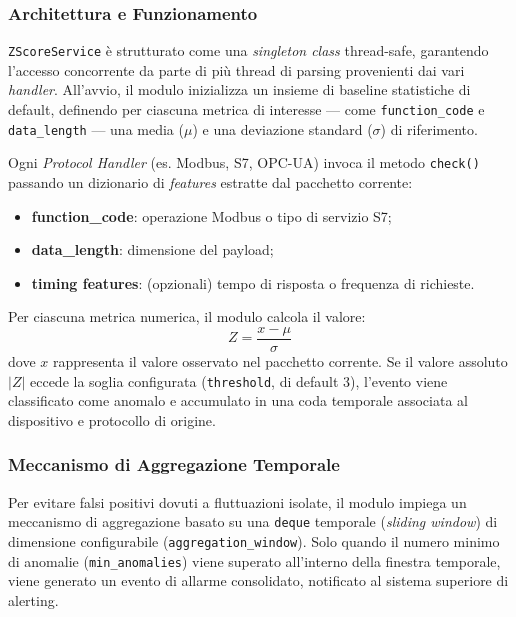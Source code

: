 \begin{enumerate}
\subsubsection{Architettura e Funzionamento}
\texttt{ZScoreService} è strutturato come una \textit{singleton class} thread-safe, garantendo l’accesso concorrente da parte di più thread di parsing provenienti dai vari \textit{handler}.  
All’avvio, il modulo inizializza un insieme di baseline statistiche di default, definendo per ciascuna metrica di interesse — come \texttt{function\_code} e \texttt{data\_length} — una media (\(\mu\)) e una deviazione standard (\(\sigma\)) di riferimento.

Ogni \textit{Protocol Handler} (es. Modbus, S7, OPC-UA) invoca il metodo \texttt{check()} passando un dizionario di \textit{features} estratte dal pacchetto corrente:
\begin{itemize}
  \item \textbf{function\_code}: operazione Modbus o tipo di servizio S7;
  \item \textbf{data\_length}: dimensione del payload;
  \item \textbf{timing features}: (opzionali) tempo di risposta o frequenza di richieste.
\end{itemize}

Per ciascuna metrica numerica, il modulo calcola il valore:
\[
Z = \frac{x - \mu}{\sigma}
\]
dove \(x\) rappresenta il valore osservato nel pacchetto corrente.  
Se il valore assoluto \(|Z|\) eccede la soglia configurata (\texttt{threshold}, di default 3), l’evento viene classificato come anomalo e accumulato in una coda temporale associata al dispositivo e protocollo di origine.

\subsubsection{Meccanismo di Aggregazione Temporale}
Per evitare falsi positivi dovuti a fluttuazioni isolate, il modulo impiega un meccanismo di aggregazione basato su una \texttt{deque} temporale (\textit{sliding window}) di dimensione configurabile (\texttt{aggregation\_window}).  
Solo quando il numero minimo di anomalie (\texttt{min\_anomalies}) viene superato all’interno della finestra temporale, viene generato un evento di allarme consolidato, notificato al sistema superiore di alerting.


\end{enumerate}
